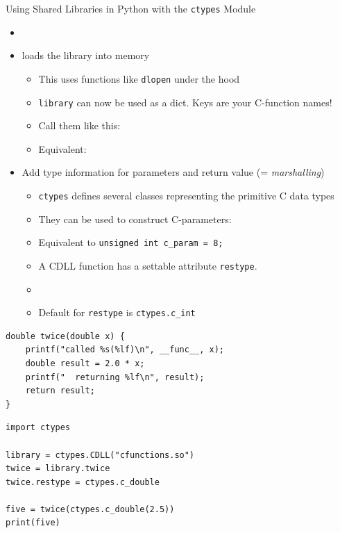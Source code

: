 \begin{frame}{Using Shared Libraries in Python with the \texttt{ctypes} Module}
%
\begin{itemize}
\item {}
\item {} loads the library into memory
	\begin{itemize}
	\item This uses functions like \texttt{dlopen} under the hood
	\item \texttt{library} can now be used as a dict. Keys are your C-function names!
	\item Call them like this: 
	\item Equivalent: 
	\end{itemize}
\item Add type information for parameters and return value (= \emph{marshalling})
	\begin{itemize}
	\item \texttt{ctypes} defines several classes representing the primitive C data types
	\item They can be used to construct C-parameters: 
	\item Equivalent to \texttt{unsigned int c_param = 8;}
	\item A CDLL function has a settable attribute \texttt{restype}.
	\item {}
	\item Default for \texttt{restype} is \texttt{ctypes.c\_int}
	\end{itemize}
\end{itemize}
%
\end{frame}


\begin{frame}[fragile]
%
\begin{codebox}
\begin{verbatim}
double twice(double x) {
    printf("called %s(%lf)\n", __func__, x);
    double result = 2.0 * x;
    printf("  returning %lf\n", result);
    return result;
}
\end{verbatim}
\end{codebox}
%
\begin{codebox}
\begin{verbatim}
import ctypes

library = ctypes.CDLL("cfunctions.so")
twice = library.twice
twice.restype = ctypes.c_double

five = twice(ctypes.c_double(2.5))
print(five)
\end{verbatim}
\end{codebox}
%
\end{frame}

